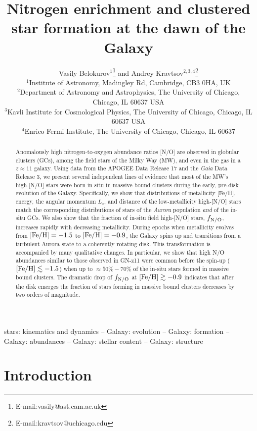 \documentclass[a4paper,useAMS,usenatbib]{mnras}
\title[Nitrogen enrichment and clustered star formation at the dawn of the Galaxy]{Nitrogen enrichment and clustered star formation at the dawn of the Galaxy}
\author[Belokurov \& Kravtsov]{Vasily  Belokurov$^{1}$\thanks{E-mail:vasily@ast.cam.ac.uk} and Andrey Kravtsov$^{2,3,4}$\thanks{E-mail:kravtsov@uchicago.edu}\\
  $^1$Institute of Astronomy, Madingley Rd, Cambridge, CB3 0HA, UK\\ 
  $^2$Department of Astronomy and Astrophysics, The University of Chicago, Chicago, IL 60637 USA\\
  $^3$Kavli Institute for Cosmological Physics, The University of Chicago, Chicago, IL 60637 USA\\
  $^4$Enrico Fermi Institute, The University of Chicago, Chicago, IL 60637}
\begin{document}

\maketitle

\label{firstpage}

\begin{abstract}
Anomalously high nitrogen-to-oxygen abundance ratios [N/O] are observed in globular clusters (GCs), among the field stars of the Milky Way (MW), and
even in the gas in a $z\approx 11$ galaxy. 
Using data from the APOGEE Data Release 17 and the {\it Gaia} Data Release 3, we 
present several independent lines of evidence that most of the MW's high-[N/O] stars were born in situ in massive bound clusters during the early, pre-disk evolution of the Galaxy. Specifically, we show that distributions of metallicity [Fe/H], energy, the angular momentum $L_z$, and distance of the low-metallicity high-[N/O] stars match the corresponding distributions of stars of the {\it Aurora} population {\it and} of the in-situ GCs. We also show that the fraction of in-situ field high-[N/O] stars, $f_{\rm N/O}$, increases rapidly with decreasing metallicity. During epochs when metallicity evolves from $\rm [Fe/H]=-1.5$ to $\rm [Fe/H]=-0.9$, the Galaxy spins up and transitions from a turbulent Aurora state to a coherently rotating disk. This transformation is accompanied by many qualitative changes. In particular, we show that high N/O abundances similar to those observed in GN-z11 were common before the spin-up ($\rm [Fe/H]\lesssim -1.5$) when up to $\approx 50\%-70\%$ of the in-situ stars formed in massive bound clusters. The dramatic drop of $f_{\rm N/O}$ at  $\rm [Fe/H]\gtrsim -0.9$ indicates that after the disk emerges the fraction of stars forming in massive bound clusters decreases by two orders of magnitude. 

\end{abstract}

\begin{keywords}
stars: kinematics and dynamics -- Galaxy: evolution -- Galaxy: formation -- Galaxy: abundances -- Galaxy: stellar content -- Galaxy: structure 
\end{keywords}

\section{Introduction}
\label{sec:intro}
\end{document}
